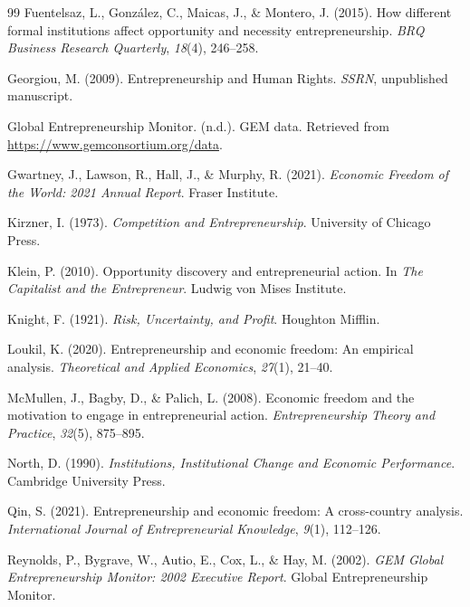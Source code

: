 \documentclass[12pt]{article}
\begin{document}
\begin{thebibliography}{99}
Fuentelsaz, L., Gonz{\'a}lez, C., Maicas, J., \& Montero, J. (2015). How different formal institutions affect opportunity and necessity entrepreneurship. \textit{BRQ Business Research Quarterly}, \textit{18}(4), 246--258.

Georgiou, M. (2009). Entrepreneurship and Human Rights. \textit{SSRN}, unpublished manuscript.

Global Entrepreneurship Monitor. (n.d.). GEM data. Retrieved from \url{https://www.gemconsortium.org/data}.

Gwartney, J., Lawson, R., Hall, J., \& Murphy, R. (2021). \textit{Economic Freedom of the World: 2021 Annual Report}. Fraser Institute.

Kirzner, I. (1973). \textit{Competition and Entrepreneurship}. University of Chicago Press.

Klein, P. (2010). Opportunity discovery and entrepreneurial action. In \textit{The Capitalist and the Entrepreneur}. Ludwig von Mises Institute.

Knight, F. (1921). \textit{Risk, Uncertainty, and Profit}. Houghton Mifflin.

Loukil, K. (2020). Entrepreneurship and economic freedom: An empirical analysis. \textit{Theoretical and Applied Economics}, \textit{27}(1), 21--40.

McMullen, J., Bagby, D., \& Palich, L. (2008). Economic freedom and the motivation to engage in entrepreneurial action. \textit{Entrepreneurship Theory and Practice}, \textit{32}(5), 875--895.

North, D. (1990). \textit{Institutions, Institutional Change and Economic Performance}. Cambridge University Press.

Qin, S. (2021). Entrepreneurship and economic freedom: A cross-country analysis. \textit{International Journal of Entrepreneurial Knowledge}, \textit{9}(1), 112--126.

Reynolds, P., Bygrave, W., Autio, E., Cox, L., \& Hay, M. (2002). \textit{GEM Global Entrepreneurship Monitor: 2002 Executive Report}. Global Entrepreneurship Monitor.


\end{thebibliography}
\end{document}
